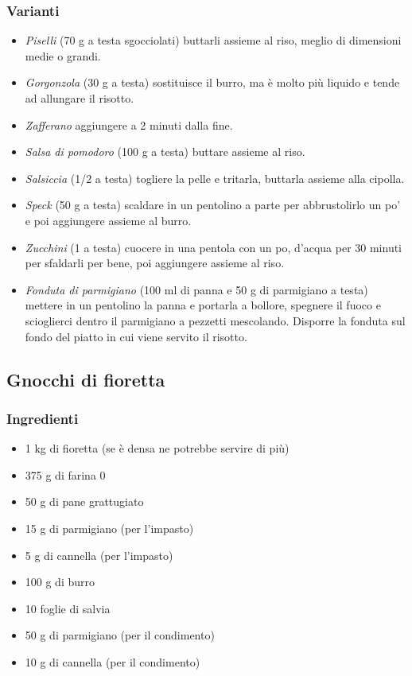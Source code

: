 \documentclass[12pt, a4paper]{article}
\begin{document}
\clearpage
\subsubsection{Varianti}
\begin{itemize}
\item \emph{Piselli} (70 g a testa sgocciolati) buttarli assieme al riso,
	meglio di dimensioni medie o grandi.
\item \emph{Gorgonzola} (30 g a testa) sostituisce il burro, ma è molto
	più liquido e tende ad allungare il risotto.
\item \emph{Zafferano} aggiungere a 2 minuti dalla fine.
\item \emph{Salsa di pomodoro} (100 g a testa) buttare assieme al riso.
\item \emph{Salsiccia} (1/2 a testa) togliere la pelle e tritarla, buttarla 
	assieme	alla cipolla.
\item \emph{Speck} (50 g a testa) scaldare in un pentolino a parte per
	abbrustolirlo un po' e poi aggiungere assieme al burro.
\item \emph{Zucchini} (1 a testa) cuocere in una pentola con un po, d'acqua
	per 30 minuti per sfaldarli per bene, poi aggiungere 
	assieme	al riso.
\item \emph{Fonduta di parmigiano} (100 ml di panna e 50 g di parmigiano a testa)
	mettere in un pentolino la panna e portarla a bollore, spegnere il fuoco e
	scioglierci dentro il parmigiano a pezzetti mescolando. Disporre la fonduta
	sul fondo del piatto in cui viene servito il risotto.
\end{itemize}
\clearpage

\subsection{Gnocchi di fioretta}

\subsubsection{Ingredienti}
\begin{itemize}
\item	1 kg di fioretta (se è densa ne potrebbe servire di più)
\item	375 g di farina 0
\item 	50 g di pane grattugiato
\item 	15 g di parmigiano (per l'impasto)
\item 	5 g di cannella (per l'impasto)
\item	100 g di burro
\item	10 foglie di salvia
\item	50 g di parmigiano (per il condimento)
\item	10 g di cannella (per il condimento)
\end{itemize}
\end{document}

